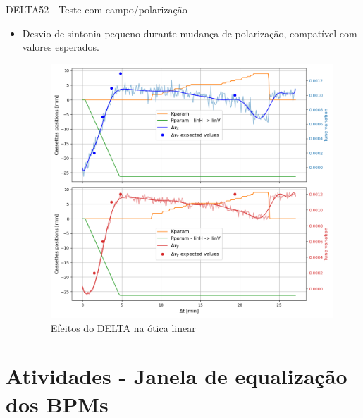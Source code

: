 \documentclass{beamer}					  %
\begin{document}
\begin{frame}{DELTA52 - Teste com campo/polarização}
    \begin{itemize}
            \item Desvio de sintonia pequeno durante mudança de polarização, compatível com valores esperados.
            \begin{figure}[H]
    		\centering
            \includegraphics[width=.7\textwidth]{2023-11-17/figures/tune_linh_linv.png}
            \caption{Efeitos do DELTA na ótica linear}
            \label{fig:linh_linv}
        \end{figure}
    \end{itemize}
\end{frame}


\section{Atividades - Janela de equalização dos BPMs}
\end{document}
